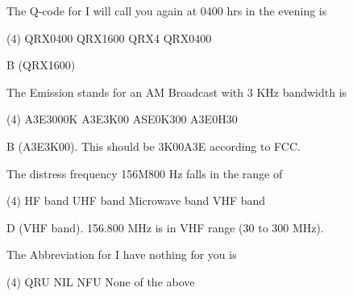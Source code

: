 \documentclass[a4paper]{article}
\begin{document}
\begin{question}The Q-code for \apostrophe{}I will call you again at 0400 hrs in the evening\apostrophe{} is \spaces
	\begin{tasks}(4)
		\task QRX0400
		\task QRX1600
		\task QRX4
		\task QRX0400
	\end{tasks}
\end{question}

\begin{solution}
	B (QRX1600)
\end{solution}

\vspace{5mm}



\begin{question}The Emission stands for an AM Broadcast with 3 KHz bandwidth is \spaces
	\begin{tasks}(4)
		\task A3E3000K
		\task A3E3K00
		\task ASE0K300
		\task A3E0H30
	\end{tasks}
\end{question}

\begin{solution}
	B (A3E3K00). This should be 3K00A3E according to FCC.
\end{solution}

\vspace{5mm}



\begin{question}The distress frequency 156M800 Hz falls in the range of \spaces
	\begin{tasks}(4)
		\task HF band
		\task UHF band
		\task Microwave band
		\task VHF band
	\end{tasks}
\end{question}

\begin{solution}
	D (VHF band). 156.800 MHz is in VHF range (30 to 300 MHz).
\end{solution}

\vspace{5mm}



\begin{question}The Abbreviation for \apostrophe{}I have nothing for you\apostrophe{} is \spaces
	\begin{tasks}(4)
		\task QRU
		\task NIL
		\task NFU
		\task None of the above
	\end{tasks}
\end{question}
\end{document}
